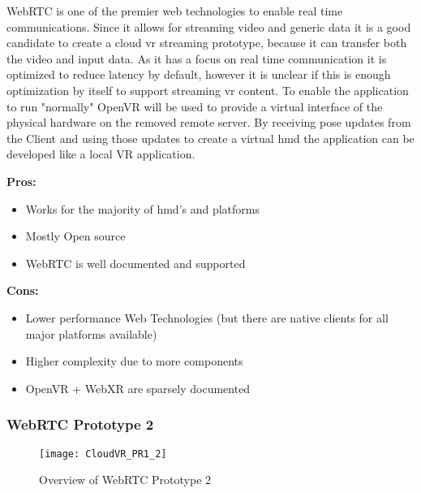 WebRTC is one of the premier web technologies to enable real time communications. Since it allows for streaming video and generic data it is a good candidate to create a cloud \acrshort{vr} streaming prototype, because it can transfer both the video and input data. As it has a focus on real time communication it is optimized to reduce latency by default, however it is unclear if this is enough optimization by itself to support streaming \acrshort{vr} content. To enable the application to run "normally" OpenVR will be used to provide a virtual interface of the physical hardware on the removed remote server. By receiving pose updates from the Client and using those updates to create a virtual \acrshort{hmd} the application can be developed like a local VR application. \\
\newline
\begin{varwidth}[t]{.5\textwidth}
\renewcommand\labelitemi{+}
\textbf{Pros:}
\begin{itemize}
\item Works for the majority of \acrshort{hmd}'s and platforms
\item Mostly Open source
\item WebRTC is well documented and supported
\end{itemize}
\end{varwidth}
\hspace{4em}
\begin{varwidth}[t]{.5\textwidth}
\renewcommand\labelitemi{-}
\textbf{Cons:}
\begin{itemize}
\item Lower performance Web Technologies (but there are native clients for all major platforms available)
\item Higher complexity due to more components
\item OpenVR + WebXR are sparsely documented
\end{itemize}
\end{varwidth}

\newpage

\subsubsection{WebRTC Prototype 2}
\begin{figure}[h!]
\caption{Overview of WebRTC Prototype 2}
\label{fig:pr12}
\texttt{[image: CloudVR\_PR1\_2]}
\end{figure}

